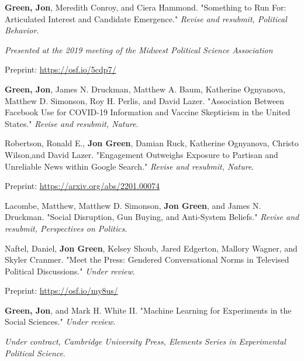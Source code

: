 \documentclass[letterpaper]{article}
\renewenvironment{itemize}{
  \begin{list}{}{
    \setlength{\leftmargin}{1.5em}
  }
}{
  \end{list}
}
\begin{document}
\begin{itemize}

\item \textbf{Green, Jon}, Meredith Conroy, and Ciera Hammond. "Something to Run For: Articulated Interest and Candidate Emergence."   \textit{Revise and resubmit, Political Behavior}.
\begin{itemize}
\item \textit{Presented at the 2019 meeting of the Midwest Political Science Association}
\item Preprint: \url{https://osf.io/5cdp7/}
\end{itemize}

\item \textbf{Green, Jon}, James N. Druckman, Matthew A. Baum, Katherine Ognyanova, Matthew D. Simonson, Roy H. Perlis, and David Lazer. "Association Between Facebook Use for COVID-19 Information and Vaccine Skepticism in the United States." \textit{Revise and resubmit, Nature}.

\item Robertson, Ronald E., \textbf{Jon Green}, Damian Ruck, Katherine Ognyanova, Christo Wilson,and  David Lazer.  "Engagement Outweighs Exposure to Partisan and Unreliable News within Google Search." \textit{Revise and resubmit, Nature}.
\begin{itemize}
\item Preprint: \url{https://arxiv.org/abs/2201.00074}
\end{itemize} 

\item Lacombe, Matthew, Matthew D. Simonson, \textbf{Jon Green}, and James N. Druckman. "Social Disruption, Gun Buying, and Anti-System Beliefs." \textit{Revise and resubmit, Perspectives on Politics}.

\item Naftel, Daniel, \textbf{Jon Green}, Kelsey Shoub, Jared Edgerton, Mallory Wagner, and Skyler Cranmer. "Meet the Press: Gendered Conversational Norms in Televised Political Discussions." \textit{Under review}.
\begin{itemize}
\item Preprint: \url{https://osf.io/my8us/}
\end{itemize}

\item  \textbf{Green, Jon}, and Mark H. White II. "Machine Learning for Experiments in the Social Sciences."  \textit{Under review}.
\begin{itemize}
\item  \textit{Under contract, Cambridge University Press, Elements Series in Experimental Political Science}.
\end{itemize}


\end{itemize}
\end{document}
